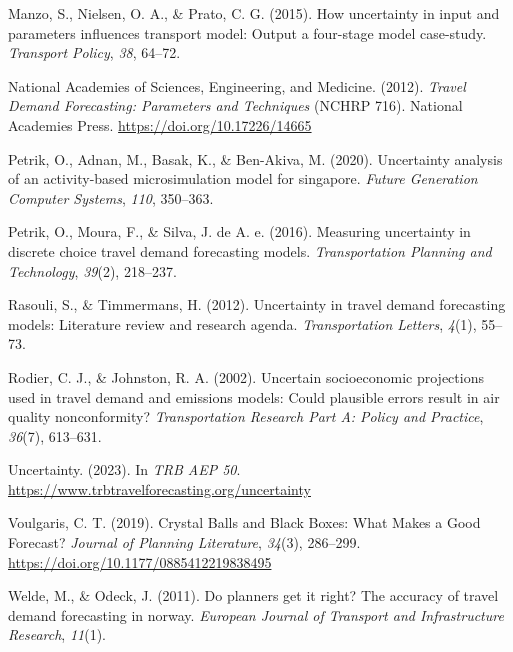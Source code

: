 \documentclass[fancy, masters,twoside]{byuthesis}
\newlength{\cslhangindent}
\newlength{\cslentryspacingunit} %
\newenvironment{CSLReferences}[2] %
 {%
  \setlength{\parindent}{0pt}
  \ifodd #1
  \let\oldpar\par
  \def\par{\hangindent=\cslhangindent\oldpar}
  \fi
  \setlength{\parskip}{#2\cslentryspacingunit}
 }%
 {}
\begin{document}
\begin{CSLReferences}{1}{0}
\leavevmode{}%
Manzo, S., Nielsen, O. A., \& Prato, C. G. (2015). How uncertainty in input and parameters influences transport model: Output a four-stage model case-study. \emph{Transport Policy}, \emph{38}, 64--72.

\leavevmode{}%
National Academies of Sciences, Engineering, and Medicine. (2012). \emph{Travel {Demand Forecasting}: {Parameters} and {Techniques}} (NCHRP 716). {National Academies Press}. \url{https://doi.org/10.17226/14665}

\leavevmode{}%
Petrik, O., Adnan, M., Basak, K., \& Ben-Akiva, M. (2020). Uncertainty analysis of an activity-based microsimulation model for singapore. \emph{Future Generation Computer Systems}, \emph{110}, 350--363.

\leavevmode{}%
Petrik, O., Moura, F., \& Silva, J. de A. e. (2016). Measuring uncertainty in discrete choice travel demand forecasting models. \emph{Transportation Planning and Technology}, \emph{39}(2), 218--237.

\leavevmode{}%
Rasouli, S., \& Timmermans, H. (2012). Uncertainty in travel demand forecasting models: Literature review and research agenda. \emph{Transportation Letters}, \emph{4}(1), 55--73.

\leavevmode{}%
Rodier, C. J., \& Johnston, R. A. (2002). Uncertain socioeconomic projections used in travel demand and emissions models: Could plausible errors result in air quality nonconformity? \emph{Transportation Research Part A: Policy and Practice}, \emph{36}(7), 613--631.

\leavevmode{}%
Uncertainty. (2023). In \emph{TRB AEP 50}. \url{https://www.trbtravelforecasting.org/uncertainty}

\leavevmode{}%
Voulgaris, C. T. (2019). Crystal {Balls} and {Black Boxes}: {What Makes} a {Good Forecast}? \emph{Journal of Planning Literature}, \emph{34}(3), 286--299. \url{https://doi.org/10.1177/0885412219838495}

\leavevmode{}%
Welde, M., \& Odeck, J. (2011). Do planners get it right? The accuracy of travel demand forecasting in norway. \emph{European Journal of Transport and Infrastructure Research}, \emph{11}(1).


\end{CSLReferences}
\end{document}
